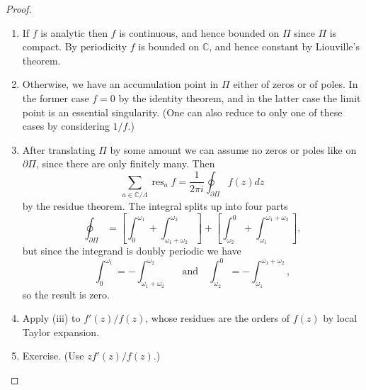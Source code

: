 \documentclass[a4paper]{article}
\theoremstyle{plain}
\theoremstyle{remark}
\theoremstyle{definition}
\DeclareMathOperator{\res}{res}
\newcommand{\C}{\mathbb{C}}
\begin{document}
\begin{proof}
    \begin{enumerate}[label=(\roman*)]
        \item If $f$ is analytic then $f$ is continuous, and hence bounded on
            $\Pi$ since $\Pi$ is compact. By periodicity $f$ is bounded on $\C$,
            and hence constant by Liouville's theorem.

        \item Otherwise, we have an accumulation point in $\Pi$ either of zeros
            or of poles. In the former case $f=0$ by the identity theorem, and
            in the latter case the limit point is an essential singularity. (One
            can also reduce to only one of these cases by considering $1/f$.)

        \item After translating $\Pi$ by some amount we can assume no zeros or
            poles like on $\partial\Pi$, since there are only finitely many.
            Then
            \begin{equation*}
                \sum_{a\in\C/\Lambda}\res_af
                    = \frac{1}{2\pi i}\oint_{\partial\Pi}f(z)dz
            \end{equation*}
            by the residue theorem. The integral splits up into four parts
            \begin{equation*}
                \oint_{\partial\Pi}
                    = \left[\int_0^{\omega_1}
                        + \int_{\omega_1+\omega_2}^{\omega_2}\right]
                    + \left[\int_{\omega_2}^0
                        + \int_{\omega_1}^{\omega_1+\omega_2}\right],
            \end{equation*}
            but since the integrand is doubly periodic we have
            \begin{equation*}
                \int_0^{\omega_1} = -\int_{\omega_1+\omega_2}^{\omega_2}
                \quad \text{and} \quad
                \int_{\omega_2}^0 = -\int_{\omega_1}^{\omega_1+\omega_2},
            \end{equation*}
            so the result is zero.

        \item Apply (iii) to $f'(z)/f(z)$, whose residues are the orders of
            $f(z)$ by local Taylor expansion.

        \item Exercise. (Use $zf'(z)/f(z)$.)
    \end{enumerate}
\end{proof}
\end{document}
